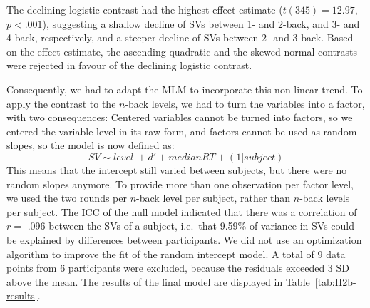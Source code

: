 \documentclass[
  man,floatsintext]{apa6}
\begin{document}
The declining logistic contrast had the highest effect estimate (\(t(345) = 12.97\), \(p < .001\)), suggesting a shallow decline of SVs between 1- and 2-back, and 3- and 4-back, respectively, and a steeper decline of SVs between 2- and 3-back.
Based on the effect estimate, the ascending quadratic and the skewed normal contrasts were rejected in favour of the declining logistic contrast.

Consequently, we had to adapt the MLM to incorporate this non-linear trend.
To apply the contrast to the \(n\)-back levels, we had to turn the variables into a factor, with two consequences:
Centered variables cannot be turned into factors, so we entered the variable level in its raw form, and factors cannot be used as random slopes, so the model is now defined as:
\[
SV \sim level\ + d' + median RT + (1|subject)
\]
This means that the intercept still varied between subjects, but there were no random slopes anymore.
To provide more than one observation per factor level, we used the two rounds per \(n\)-back level per subject, rather than \(n\)-back levels per subject.
The ICC of the null model indicated that there was a correlation of \(r=\) .096 between the SVs of a subject, i.e.~that 9.59\% of variance in SVs could be explained by differences between participants.
We did not use an optimization algorithm to improve the fit of the random intercept model.
A total of 9 data points from 6 participants were excluded, because the residuals exceeded 3 SD above the mean.
The results of the final model are displayed in Table~\ref{tab:H2b-results}.
\end{document}
